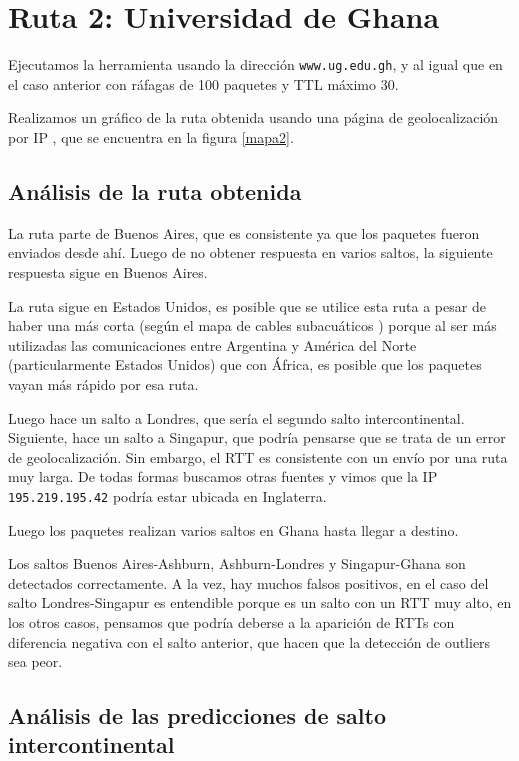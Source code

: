 \section{Ruta 2: Universidad de Ghana}

Ejecutamos la herramienta usando la dirección \texttt{www.ug.edu.gh}, y al igual que en el caso anterior con ráfagas de 100 paquetes y TTL máximo 30.

Realizamos un gráfico de la ruta obtenida usando una página de geolocalización por IP \cite{ip2location}, que se encuentra en la figura \ref{mapa2}.

\subsection{Análisis de la ruta obtenida}

La ruta parte de Buenos Aires, que es consistente ya que los paquetes fueron enviados desde ahí. Luego de no obtener respuesta en varios saltos, la siguiente respuesta sigue en Buenos Aires.

La ruta sigue en Estados Unidos, es posible que se utilice esta ruta a pesar de haber una más corta (según el mapa de cables subacuáticos \cite{cables}) porque al ser más utilizadas las comunicaciones entre Argentina y América del Norte (particularmente Estados Unidos) que con África, es posible que los paquetes vayan más rápido por esa ruta.

Luego hace un salto a Londres, que sería el segundo salto intercontinental. Siguiente, hace un salto a Singapur, que podría pensarse que se trata de un error de geolocalización. Sin embargo, el RTT es consistente con un envío por una ruta muy larga. De todas formas buscamos otras fuentes y vimos que la IP \texttt{195.219.195.42} podría estar ubicada en Inglaterra.

Luego los paquetes realizan varios saltos en Ghana hasta llegar a destino. 

Los saltos Buenos Aires-Ashburn, Ashburn-Londres y Singapur-Ghana son detectados correctamente. A la vez, hay muchos falsos positivos, en el caso del salto Londres-Singapur es entendible porque es un salto con un RTT muy alto, en los otros casos, pensamos que podría deberse a la aparición de RTTs con diferencia negativa con el salto anterior, que hacen que la detección de outliers sea peor.

\subsection{Análisis de las predicciones de salto intercontinental}

